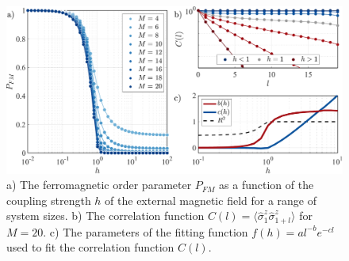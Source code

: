 \begin{figure}[ht]
    \centering
    \includegraphics[width=\textwidth]{Chapters/Plots/Chapter2/Chapter1_Fig1.pdf}
    \caption{a) The ferromagnetic order parameter $P_{FM}$ as a function of the coupling strength $h$ of the external magnetic field for a range of system sizes. b) The correlation function $C(l) = \langle \hat{\sigma}^z_1 \hat{\sigma}^z_{1+l} \rangle$ for $M = 20$. c) The parameters of the fitting function $f(h) = a l^{-b} e^{-c l}$ used to fit the correlation function $C(l)$.} 
    \label{fig:Chapter1_Fig1}
\end{figure}

